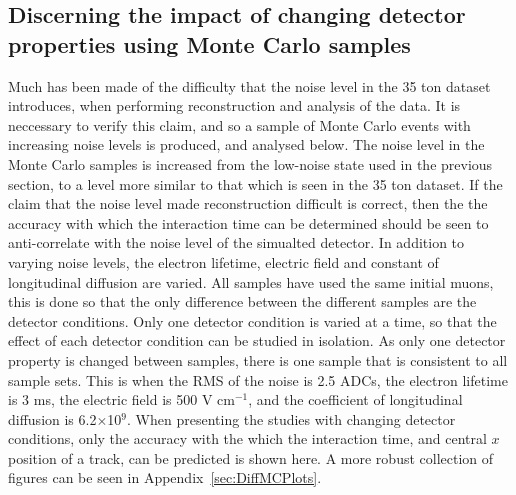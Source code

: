 \subsection{Discerning the impact of changing detector properties using Monte Carlo samples} \label{sec:DiffMCStudies}
Much has been made of the difficulty that the noise level in the 35 ton dataset introduces, when performing reconstruction and analysis of the data. It is neccessary to verify this claim, and so a sample of Monte Carlo events with increasing noise levels is produced, and analysed below. The noise level in the Monte Carlo samples is increased from the low-noise state used in the previous section, to a level more similar to that which is seen in the 35 ton dataset. If the claim that the noise level made reconstruction difficult is correct, then the the accuracy with which the interaction time can be determined should be seen to anti-correlate with the noise level of the simualted detector. In addition to varying noise levels, the electron lifetime, electric field and constant of longitudinal diffusion are varied. All samples have used the same initial muons, this is done so that the only difference between the different samples are the detector conditions. Only one detector condition is varied at a time, so that the effect of each detector condition can be studied in isolation. As only one detector property is changed between samples, there is one sample that is consistent to all sample sets. This is when the RMS of the noise is 2.5 ADCs, the electron lifetime is 3 ms, the electric field is 500 V cm$^{-1}$, and the coefficient of longitudinal diffusion is 6.2$\times$10$^9$. When presenting the studies with changing detector conditions, only the accuracy with the which the interaction time, and central $x$ position of a track, can be predicted is shown here. A more robust collection of figures can be seen in Appendix~\ref{sec:DiffMCPlots}. \\

